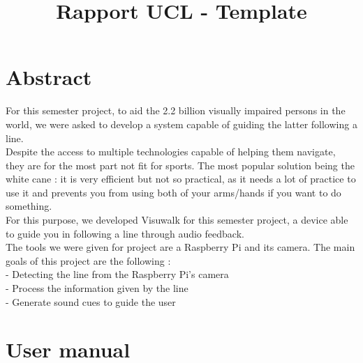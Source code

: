 \documentclass{rapport}
\title{Rapport UCL - Template} %
\begin{document}



        
\fairemarges %
\fairepagedegarde %
\tableofcontents%
\newpage

\section{Abstract}


For this semester project, to aid the 2.2 billion visually impaired persons in the world, we were asked to develop a system capable of guiding the latter following a line.\\ Despite the access to multiple technologies capable of helping them navigate, they are for the most part not fit for sports. The most popular solution being the white cane : it is very efficient but not so practical, as it needs a lot of practice to use it and prevents you from using both of your arms/hands if you want to do something.\\For this purpose, we developed Visuwalk for this semester project, a device able to guide you in following a line through audio feedback.\\
The tools we were given for project are a Raspberry Pi and its camera. The main goals of this project are the following :\\
- Detecting the line from the Raspberry Pi’s camera\\
- Process the information given by the line\\
- Generate sound cues to guide the user

\section {User manual}
\end{document}
